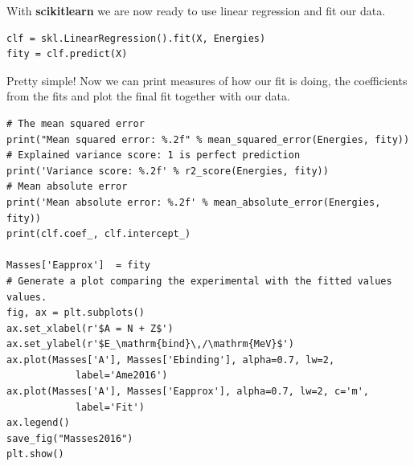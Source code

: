 \documentclass{beamer}
\begin{document}
\begin{frame}
\begin{verbatim}
\end{verbatim}

With \textbf{scikitlearn} we are now ready to use linear regression and fit our data.



\begin{verbatim}
clf = skl.LinearRegression().fit(X, Energies)
fity = clf.predict(X)

\end{verbatim}

Pretty simple!  
Now we can print measures of how our fit is doing, the coefficients from the fits and plot the final fit together with our data.





















\begin{verbatim}
# The mean squared error                               
print("Mean squared error: %.2f" % mean_squared_error(Energies, fity))
# Explained variance score: 1 is perfect prediction                                 
print('Variance score: %.2f' % r2_score(Energies, fity))
# Mean absolute error                                                           
print('Mean absolute error: %.2f' % mean_absolute_error(Energies, fity))
print(clf.coef_, clf.intercept_)

Masses['Eapprox']  = fity
# Generate a plot comparing the experimental with the fitted values values.
fig, ax = plt.subplots()
ax.set_xlabel(r'$A = N + Z$')
ax.set_ylabel(r'$E_\mathrm{bind}\,/\mathrm{MeV}$')
ax.plot(Masses['A'], Masses['Ebinding'], alpha=0.7, lw=2,
            label='Ame2016')
ax.plot(Masses['A'], Masses['Eapprox'], alpha=0.7, lw=2, c='m',
            label='Fit')
ax.legend()
save_fig("Masses2016")
plt.show()

\end{verbatim}



\end{frame}
\end{document}
